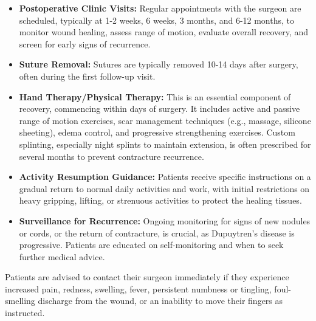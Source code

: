 \begin{itemize}
  \item \textbf{Postoperative Clinic Visits:} Regular appointments with the surgeon are scheduled, typically at 1-2 weeks, 6 weeks, 3 months, and 6-12 months, to monitor wound healing, assess range of motion, evaluate overall recovery, and screen for early signs of recurrence.
  \item \textbf{Suture Removal:} Sutures are typically removed 10-14 days after surgery, often during the first follow-up visit.
  \item \textbf{Hand Therapy/Physical Therapy:} This is an essential component of recovery, commencing within days of surgery. It includes active and passive range of motion exercises, scar management techniques (e.g., massage, silicone sheeting), edema control, and progressive strengthening exercises. Custom splinting, especially night splints to maintain extension, is often prescribed for several months to prevent contracture recurrence.
  \item \textbf{Activity Resumption Guidance:} Patients receive specific instructions on a gradual return to normal daily activities and work, with initial restrictions on heavy gripping, lifting, or strenuous activities to protect the healing tissues.
  \item \textbf{Surveillance for Recurrence:} Ongoing monitoring for signs of new nodules or cords, or the return of contracture, is crucial, as Dupuytren's disease is progressive. Patients are educated on self-monitoring and when to seek further medical advice.
\end{itemize}
Patients are advised to contact their surgeon immediately if they experience increased pain, redness, swelling, fever, persistent numbness or tingling, foul-smelling discharge from the wound, or an inability to move their fingers as instructed.

